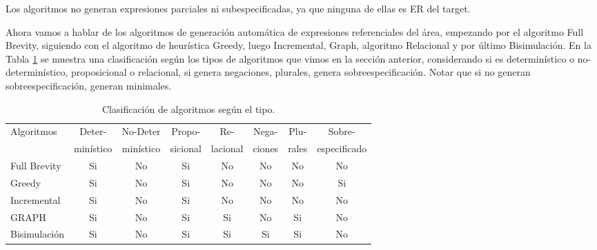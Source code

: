 Los algoritmos no generan expresiones parciales ni subespecificadas, ya que ninguna de ellas es ER del target.





Ahora vamos a hablar de los algoritmos de generaci\'on autom\'atica de expresiones referenciales del \'area, empezando por el algoritmo Full Brevity, siguiendo con el algoritmo de heur\'istica Greedy, luego Incremental, Graph, algoritmo Relacional y por \'ultimo Bisimulaci\'on. En la Tabla \ref{clasificacion_algoritmos} se muestra una clasificaci\'on seg\'un los tipos de algoritmos que vimos en la secci\'on anterior, considerando si es determin\'istico o no-determin\'istico, proposicional o relacional, si genera negaciones, plurales, genera sobreespecificaci\'on. Notar que si no generan sobreespecificaci\'on, generan minimales. \\
\label{sec:algoritmos_area}

\begin{table}[h!]
\begin{center}
\begin{tabular}{|l|c|c|c|c|c|c|c|}
\hline
 Algoritmos& Deter- & No-Deter & Propo- & Re- & Nega- & Plu- & Sobre- \\
 & min\'istico & min\'istico & sicional & lacional & ciones & rales & especificado \\
\hline
Full Brevity &Si & No&Si&No&No&No& No \\
Greedy&Si & No&Si&No&No&No& Si \\
Incremental&Si & No&Si&No&No&No& No \\
GRAPH&Si & No&Si&Si&No&Si& No \\
Bisimulaci\'on&Si & No&Si&Si&Si&Si& No \\ \hline

\end{tabular}
\caption{Clasificaci\'on de algoritmos seg\'un el tipo.} 
\label{clasificacion_algoritmos}
\vspace*{-.5cm}
\end{center}
\end{table}



